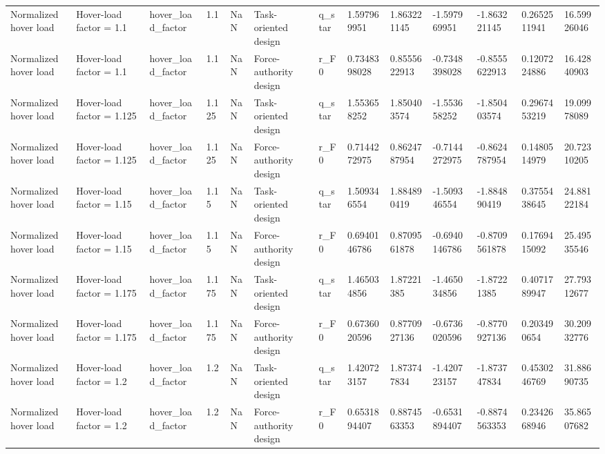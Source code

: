 \begin{tabular}{@{}lllllllllllll@{}}
Normalized hover load & Hover-load factor = 1.1 & hover\_load\_factor & 1.1 & NaN & Task-oriented design & q\_star & 1.597969951 & 1.863221145 & -1.597969951 & -1.863221145 & 0.2652511941 & 16.59926046 \\
Normalized hover load & Hover-load factor = 1.1 & hover\_load\_factor & 1.1 & NaN & Force-authority design & r\_F0 & 0.7348398028 & 0.8555622913 & -0.7348398028 & -0.8555622913 & 0.1207224886 & 16.42840903 \\
Normalized hover load & Hover-load factor = 1.125 & hover\_load\_factor & 1.125 & NaN & Task-oriented design & q\_star & 1.553658252 & 1.850403574 & -1.553658252 & -1.850403574 & 0.2967453219 & 19.09978089 \\
Normalized hover load & Hover-load factor = 1.125 & hover\_load\_factor & 1.125 & NaN & Force-authority design & r\_F0 & 0.7144272975 & 0.8624787954 & -0.7144272975 & -0.8624787954 & 0.1480514979 & 20.72310205 \\
Normalized hover load & Hover-load factor = 1.15 & hover\_load\_factor & 1.15 & NaN & Task-oriented design & q\_star & 1.509346554 & 1.884890419 & -1.509346554 & -1.884890419 & 0.3755438645 & 24.88122184 \\
Normalized hover load & Hover-load factor = 1.15 & hover\_load\_factor & 1.15 & NaN & Force-authority design & r\_F0 & 0.6940146786 & 0.8709561878 & -0.6940146786 & -0.8709561878 & 0.1769415092 & 25.49535546 \\
Normalized hover load & Hover-load factor = 1.175 & hover\_load\_factor & 1.175 & NaN & Task-oriented design & q\_star & 1.465034856 & 1.87221385 & -1.465034856 & -1.87221385 & 0.4071789947 & 27.79312677 \\
Normalized hover load & Hover-load factor = 1.175 & hover\_load\_factor & 1.175 & NaN & Force-authority design & r\_F0 & 0.6736020596 & 0.8770927136 & -0.6736020596 & -0.8770927136 & 0.203490654 & 30.20932776 \\
Normalized hover load & Hover-load factor = 1.2 & hover\_load\_factor & 1.2 & NaN & Task-oriented design & q\_star & 1.420723157 & 1.873747834 & -1.420723157 & -1.873747834 & 0.4530246769 & 31.88690735 \\
Normalized hover load & Hover-load factor = 1.2 & hover\_load\_factor & 1.2 & NaN & Force-authority design & r\_F0 & 0.6531894407 & 0.8874563353 & -0.6531894407 & -0.8874563353 & 0.2342668946 & 35.86507682 \\
\bottomrule
\end{tabular}
